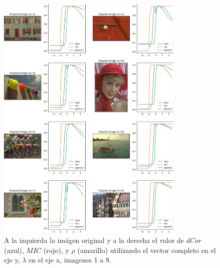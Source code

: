 \begin{figure}
    \centering
    \includegraphics[width=0.8\textwidth]{figuras/full_comp_1.png}
    \caption{A la izquierda la im\'agen original y a la derecha el valor de $dCor$ (azul), $MIC$ (rojo), y $\rho$ (amarillo) utilizando el vector completo en el eje y, $\lambda$ en el eje x, imagenes 1 a 8.}
\end{figure}

